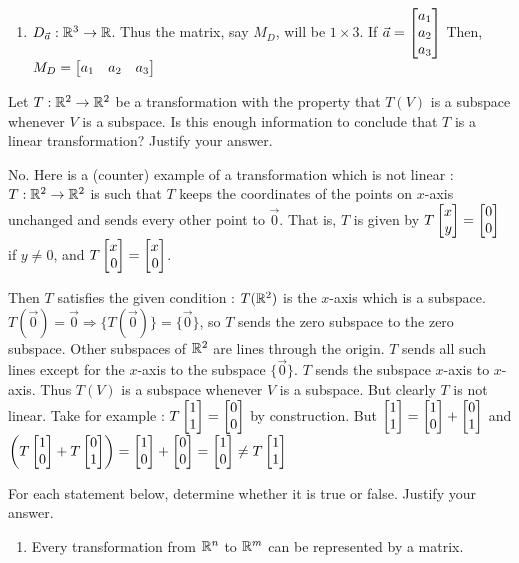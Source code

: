 \begin{exercises}
\begin{problist}
\begin{solution}
\begin{enumerate}
				\item $D_{\vec{a}}: \mathbb{R}^{3}\rightarrow \mathbb{R}$. Thus the matrix, say
					$M_{D}$, will be $1 \times 3$. If
					$\vec{a}= \mat{a_1\\a_2\\ a_3}$ Then, $M_{D}= \mat
					{a_1 & a_2 & a_3}$
			\end{enumerate}
		\end{solution}

		\prob Let $T:\mathbb{R}^{2}\to\mathbb{R}^{2}$ be a transformation with the property that
		$T(V)$ is a subspace whenever $V$ is a subspace. Is this enough
		information to conclude that $T$ is a linear transformation? Justify your
		answer.
		\begin{solution}
			No. Here is a (counter) example of a transformation which is not linear
			: $T : \mathbb{R}^{2}\rightarrow \mathbb{R}^{2}$ is such that $T$ keeps the coordinates
			of the points on $x$-axis unchanged and sends every other point to $\vec
			{0}$. That is, $T$ is given by $T \mat{x\\y}= \mat{0\\0}$ if $y\neq
			0$, and $T\mat{x\\0}= \mat{x\\0}$.

			Then $T$ satisfies the given condition : $T(\mathbb{R}^{2})$ is the $x$-axis
			which is a subspace.
			$T(\vec{0})= \vec{0}\Rightarrow \{T(\vec{0}) \} = \{\vec{0}\}$, so $T$
			sends the zero subspace to the zero subspace. Other subspaces of
			$\mathbb{R}^{2}$ are lines through the origin. $T$ sends all such lines except
			for the $x$-axis to the subspace $\{ \vec{0}\}$. $T$ sends the
			subspace $x$-axis to $x$-axis. Thus $T(V)$ is a subspace whenever $V$
			is a subspace. But clearly $T$ is not linear. Take for example : $T
			\mat{1\\1}= \mat{0\\0}$ by construction. But
			$\mat{1\\1}= \mat{1\\0}+ \mat{0\\1}$ and
			$\left( T\mat{1\\0}+ T \mat{0\\1}\right)= \mat{1\\0}+ \mat{0\\0}=
			\mat{1\\0}\neq T \mat{1\\1}$
		\end{solution}

		\prob For each statement below, determine whether it is true or false.
		Justify your answer.
		\begin{enumerate}
			\item Every transformation from $\mathbb{R}^{n}$ to $\mathbb{R}^{m}$ can be
				represented by a matrix.


\end{enumerate}
\end{problist}
\end{exercises}
